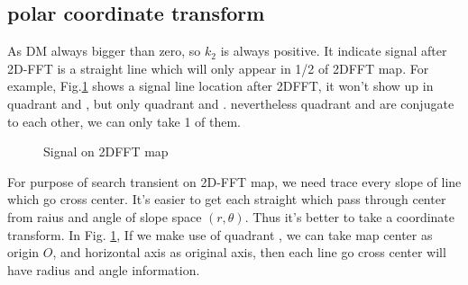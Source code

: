 \documentclass[twocolumn]{aastex61}
\begin{document}
\subsection{polar coordinate transform}\label{sec:polar coordinate transform}

As DM always bigger than zero, so $k_2$ is always positive. It indicate signal after 2D-FFT is a straight line which will only appear in 1/2 of 2DFFT map. For example, Fig.\ref{fig:2DFFT} shows a signal line location after 2DFFT, it won't show up in quadrant \uppercase\expandafter{} and  \uppercase\expandafter{}, but only quadrant \uppercase\expandafter{} and \uppercase\expandafter{}. nevertheless quadrant \uppercase\expandafter{} and \uppercase\expandafter{} are conjugate to each other, we can only take 1 of them.

\begin{figure}
\caption{Signal on 2DFFT map \label{fig:2DFFT}}
\end{figure}

For purpose of search transient on 2D-FFT map, we need trace every slope of line which go cross center. It's easier to get each straight which pass through center from raius and angle of slope space $(r,\theta)$. Thus it's better to take a coordinate transform.  In Fig. \ref{fig:2DFFT},  If we make use of quadrant \uppercase\expandafter{}, we can take map center as origin $O$, and horizontal axis as original axis, then each line go cross center will have radius and angle information. 

\end{document}
